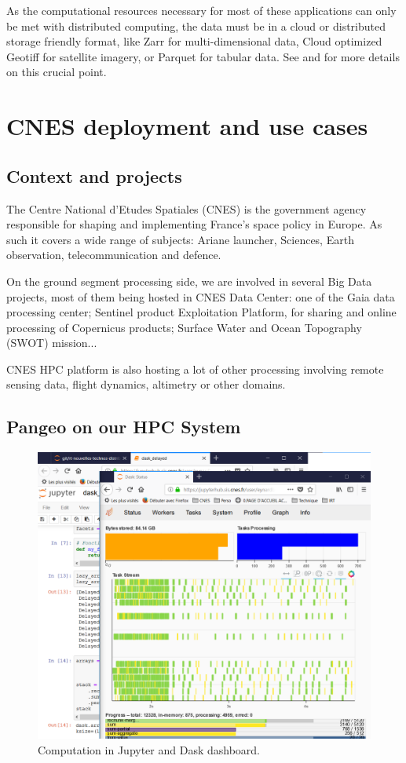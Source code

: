 \documentclass{article}
\begin{document}
As the computational resources necessary for most of these applications can only
be met with distributed computing, the data must be in a cloud or distributed
storage friendly format, like Zarr for multi-dimensional data, Cloud optimized
Geotiff for satellite imagery, or Parquet for tabular data. See \cite{b7} and
\cite{b11} for more details on this crucial point.


\section{CNES deployment and use cases}
\label{sec:cnes}

\subsection{Context and projects}
\label{ssec:context}

The Centre National d'Etudes Spatiales (CNES) is the government agency responsible for shaping and implementing France's space policy in Europe. As such it covers a wide range of subjects: Ariane launcher, Sciences, Earth observation, telecommunication and defence.

On the ground segment processing side, we are involved in several Big Data projects, most of them being hosted in CNES Data Center: one of the Gaia data processing center; Sentinel product Exploitation Platform, for sharing and online processing of Copernicus products; Surface Water and Ocean Topography (SWOT) mission...

CNES HPC platform is also hosting a lot of other processing involving remote sensing data, flight dynamics, altimetry or other domains.

\subsection{Pangeo on our HPC System}
\label{ssec:pangeohpc}

\begin{figure}
  \centering
  \includegraphics[width=\columnwidth]{dask_jobqueue.png}
  \caption{\label{dask_jobqueue} Computation in Jupyter and Dask dashboard.}
\end{figure}
\end{document}
